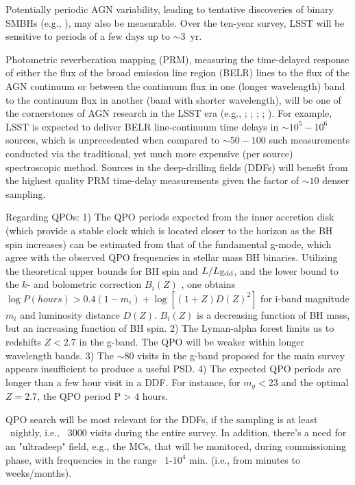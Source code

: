 Potentially periodic AGN variability, leading to tentative discoveries
of binary SMBHs (e.g., \citet{GrahamEtal2015}), may also be
measurable.  Over the ten-year survey, LSST will be sensitive to
periods of a few days up to $\sim3$~yr.

Photometric reverberation mapping (PRM), measuring the time-delayed
response of either the flux of the broad emission line region (BELR)
lines to the flux of the AGN continuum or between the continuum flux
in one (longer wavelength) band to the continuum flux in another (band
with shorter wavelength), will be one of the cornerstones of AGN
research in the LSST era (e.g., \citet{Chelouche2013};
\citet{CheloucheandZucker2013}; \citet{CheloucheEtal2014};
\citet{EdelsonEtal2015}; \citet{FausnaughEtal2015}). For example, LSST
is expected to deliver BELR line-continuum time delays in
$\sim10^5-10^6$ sources, which is unprecedented when compared to
$\sim50-100$ such measurements conducted via the traditional, yet much
more expensive (per source) spectroscopic method. Sources in the
deep-drilling fields (DDFs) will benefit from the highest quality PRM
time-delay measurements given the factor of $\sim10$ denser sampling.


Regarding QPOs:
1) The QPO periods expected from the inner accretion disk (which provide
 a stable clock which is located closer to the horizon as the BH spin
  increases) can be estimated from that of the fundamental g-mode, which agree
   with the observed QPO frequencies in stellar mass BH binaries. Utilizing the
    theoretical upper bounds for BH spin and $L/L_{\rm Edd}$, and the lower bound
     to the $k$- and bolometric correction $B_i(Z)$ , one obtains
 $\log P(hours) > 0.4(1-m_i) + \log[(1+Z)D(Z)^2]$
for i-band magnitude $m_i$ and luminosity distance $D(Z)$. $B_i(Z)$ is a decreasing 
function of BH mass, but an increasing function of BH spin.
2) The Lyman-alpha forest limits us to redshifts $Z < 2.7$ in the g-band. The QPO 
will be weaker within longer wavelength bands.
3) The $\sim 80$ visits in the g-band proposed for the main survey appears 
insufficient to produce a useful PSD.
4) The expected QPO periods are longer than a few hour visit in a DDF. For instance,
 for $m_g  <  23$ and the optimal $Z =  2.7$, the QPO period P > 4 hours.

QPO search will be most relevant for the DDFs, if the sampling is at least ~nightly, i.e., ~3000 visits
during the entire survey. In addition, there's a need for an "ultradeep" field, e.g., the MCs, that will
be monitored, during commissioning phase, with frequencies in the range ~$1$-$10^4$ min. (i.e., from
minutes to weeks/months).

